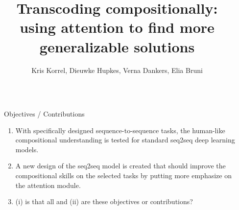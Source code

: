 \documentclass[final,hyperref={pdfpagelabels=false}]{beamer}
\title{\huge{Transcoding compositionally:}\\ \huge{using attention to find more generalizable solutions}} %
\author{Kris Korrel, Dieuwke Hupkes, Verna Dankers, Elia Bruni} %
\institute{University of Amsterdam} %
\begin{document}

\begin{frame}[t] %

\begin{columns}[t] %

\begin{column}{.02\textwidth}\end{column} %

\begin{column}{.465\textwidth} %


\begin{block}{Objectives / Contributions}

\begin{enumerate}
\item With specifically designed sequence-to-sequence tasks, the human-like compositional understanding is tested for standard seq2seq deep learning models.
\item A new design of the seq2seq model is created that should improve the compositional skills on the selected tasks by putting more emphasize on the attention module.
\item (i) is that all and (ii) are these objectives or contributions?
\end{enumerate}

\end{block}

            

\end{column}
\end{columns}
\end{frame}
\end{document}
